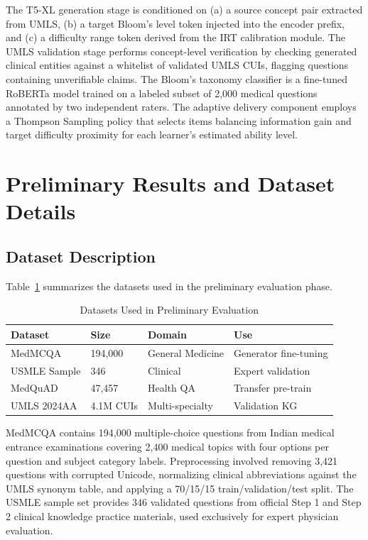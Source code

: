 \documentclass[conference]{IEEEtran}
\begin{document}
The T5-XL generation stage is conditioned on (a) a source concept pair extracted from UMLS, (b) a target Bloom's level token injected into the encoder prefix, and (c) a difficulty range token derived from the IRT calibration module. The UMLS validation stage performs concept-level verification by checking generated clinical entities against a whitelist of validated UMLS CUIs, flagging questions containing unverifiable claims. The Bloom's taxonomy classifier is a fine-tuned RoBERTa model trained on a labeled subset of 2,000 medical questions annotated by two independent raters. The adaptive delivery component employs a Thompson Sampling policy that selects items balancing information gain and target difficulty proximity for each learner's estimated ability level.

\section{Preliminary Results and Dataset Details}

\subsection{Dataset Description}

Table~\ref{tab:datasets} summarizes the datasets used in the preliminary evaluation phase.

\begin{table}[htbp]
\caption{Datasets Used in Preliminary Evaluation}
\label{tab:datasets}
\centering
\begin{tabular}{p{2.0cm} p{1.4cm} p{1.6cm} p{2.0cm}}
\toprule
\textbf{Dataset} & \textbf{Size} & \textbf{Domain} & \textbf{Use} \\
\midrule
MedMCQA~\cite{pal2022medmcqa} & 194,000 & General Medicine & Generator fine-tuning \\
USMLE Sample & 346 & Clinical & Expert validation \\
MedQuAD & 47,457 & Health QA & Transfer pre-train \\
UMLS 2024AA & 4.1M CUIs & Multi-specialty & Validation KG \\
\bottomrule
\end{tabular}
\end{table}

MedMCQA \cite{pal2022medmcqa} contains 194,000 multiple-choice questions from Indian medical entrance examinations covering 2,400 medical topics with four options per question and subject category labels. Preprocessing involved removing 3,421 questions with corrupted Unicode, normalizing clinical abbreviations against the UMLS synonym table, and applying a 70/15/15 train/validation/test split. The USMLE sample set provides 346 validated questions from official Step 1 and Step 2 clinical knowledge practice materials, used exclusively for expert physician evaluation.
\end{document}
